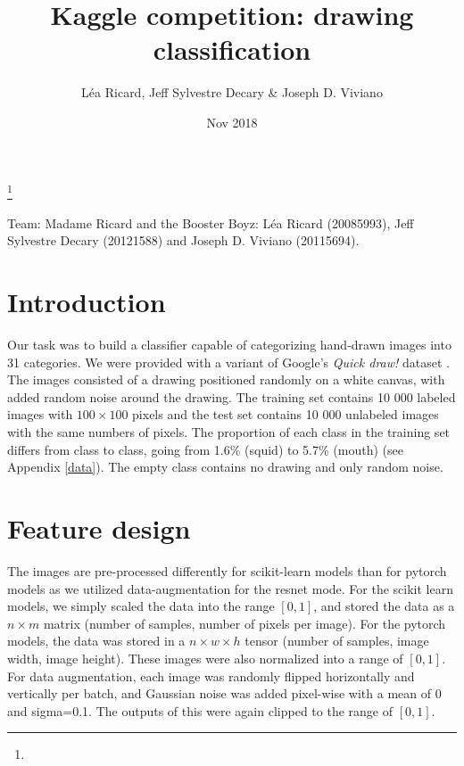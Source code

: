 \documentclass[reqno]{amsart}
\begin{document}
\title{Kaggle competition: drawing classification}

\author{L\'ea Ricard, Jeff Sylvestre Decary \& Joseph D. Viviano}

\address{Universit\'e de Montr\'eal}
\curraddr{}
\thanks{}
\date{Nov 2018}

\maketitle

\noindent 
Team: Madame Ricard and the Booster Boyz: L\'ea Ricard (20085993), Jeff Sylvestre Decary (20121588) and Joseph D. Viviano (20115694).



\section{Introduction}
Our task was to build a classifier capable of categorizing hand-drawn images into 31 categories. We were provided with a variant of Google's \textit{Quick draw!} dataset \cite{Quick_draw}. The images consisted of a drawing positioned randomly on a white canvas, with added random noise around the drawing. The training set contains 10 000 labeled images with $100\times100$ pixels and the test set contains 10 000 unlabeled images with the same numbers of pixels. The proportion of each class in the training set differs from class to class, going from 1.6\% (squid) to 5.7\% (mouth) (see Appendix \ref{data}). The empty class contains no drawing and only random noise.
\section{Feature design}
The images are pre-processed differently for scikit-learn models than for pytorch models as we utilized data-augmentation for the resnet mode. For the scikit learn models, we simply scaled the data into the range $[0, 1]$, and stored the data as a $n \times m$ matrix (number of samples, number of pixels per image). For the pytorch models, the data was stored in a $n \times w \times h$ tensor (number of samples, image width, image height). These images were also normalized into a range of $[0, 1]$. For data augmentation, each image was randomly flipped horizontally and vertically per batch, and Gaussian noise was added pixel-wise with a mean of 0 and sigma=0.1. The outputs of this were again clipped to the range of $[0, 1]$.\\
\end{document}
